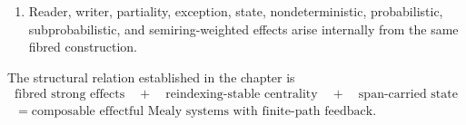 \begin{enumerate}
    \item Reader, writer, partiality, exception, state, nondeterministic,
    probabilistic, subprobabilistic, and semiring-weighted effects arise
    internally from the same fibred construction.
\end{enumerate}

The structural relation established in the chapter is
\[
    \boxed{
    \begin{gathered}
        \text{fibred strong effects}
        \quad+\quad
        \text{reindexing-stable centrality}
        \quad+\quad
        \text{span-carried state}
        \\
        =
        \text{composable effectful Mealy systems with finite-path feedback}.
    \end{gathered}
    }
\]